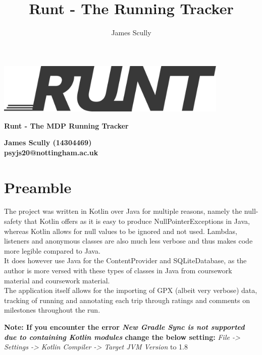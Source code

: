 \documentclass[11pt]{article}
\title{\textbf{Runt - The Running Tracker}}
\author{James Scully}
\begin{document}
\hspace{0pt}

\vfill

\begin{center}
	\includegraphics[width=30em]{runtlogo_dark}
	
	\vspace{1cm}	
	{\Large \textbf{Runt - The MDP Running Tracker}} \linebreak
	
	\begin{large}
		\textbf{James Scully (14304469) \\
		psyjs20@nottingham.ac.uk \\}
	\end{large}
	
\end{center}

\vfill

\pagebreak

\tableofcontents

\newpage

\section{Preamble}
The project was written in Kotlin over Java for multiple reasons, namely the null-safety that Kotlin offers as it is easy to produce NullPointerExceptions in Java, whereas Kotlin allows for null values to be ignored and not used. Lambdas, listeners and anonymous classes are also much less verbose and thus makes code more legible compared to Java. \\

It does however use Java for the ContentProvider and SQLiteDatabase, as the author is more versed with these types of classes in Java from coursework material and coursework material.\\

The application itself allows for the importing of GPX (albeit very verbose) data, tracking of running and annotating each trip through ratings and comments on milestones throughout the run.

\textbf{Note: If you encounter the error \textit{New Gradle Sync is not supported due to containing Kotlin modules} change the below setting:}
\textit{File -> Settings -> Kotlin Compiler -> Target JVM Version} to 1.8
\end{document}
